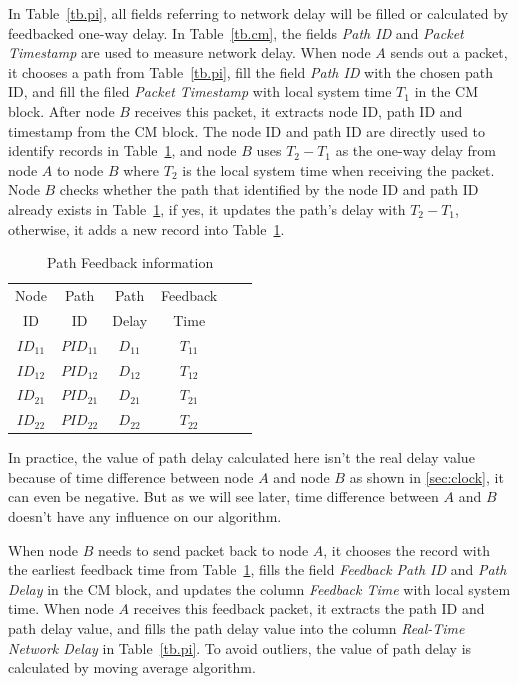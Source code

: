 In Table~\ref{tb.pi}, all fields referring to network delay will be filled or calculated by feedbacked one-way delay. In Table~\ref{tb.cm}, the fields \emph{Path ID} and \emph{Packet Timestamp} are used to measure network delay. When node $A$ sends out a packet, it chooses a path from Table~\ref{tb.pi}, fill the field \emph{Path ID} with the chosen path ID, and fill the filed \emph{Packet Timestamp} with local system time $T_1$ in the CM block. After node $B$ receives this packet, it extracts node ID, path ID and timestamp from the CM block. The node ID and path ID are directly used to identify records in Table~\ref{tb.ps}, and node $B$ uses $T_2-T_1$ as the one-way delay from node $A$ to node $B$ where $T_2$ is the local system time when receiving the packet. Node $B$ checks whether the path that identified by the node ID and path ID already exists in Table~\ref{tb.ps}, if yes, it updates the path's delay with $T_2-T_1$, otherwise, it adds a new record into Table~\ref{tb.ps}.

\begin{table}[htbp]
\caption{\label{tb.ps}Path Feedback information}
\centering
\begin{tabular}{|c|c|c|c|c|c|}
\hline
 Node   & Path    & Path      & Feedback           \\
  ID    &  ID     & Delay     & Time               \\
\hline
${ID}_{11}$&${PID}_{11}$&${D}_{11}$&${T}_{11}$   \\
\hline
${ID}_{12}$&${PID}_{12}$&${D}_{12}$&${T}_{12}$   \\
\hline
${ID}_{21}$&${PID}_{21}$&${D}_{21}$&${T}_{21}$   \\
\hline
${ID}_{22}$&${PID}_{22}$&${D}_{22}$&${T}_{22}$   \\
\hline
\end{tabular}
\end{table}

In practice, the value of path delay calculated here isn't the real delay value because of time difference between node $A$ and node $B$ as shown in \ref{sec:clock}, it can even be negative. But as we will see later, time difference between $A$ and $B$ doesn't have any influence on our algorithm.

When node $B$ needs to send packet back to node $A$, it chooses the record with the earliest feedback time from Table~\ref{tb.ps}, fills the field \emph{Feedback Path ID} and \emph{Path Delay} in the CM block, and updates the column \emph{Feedback Time} with local system time. When node $A$ receives this feedback packet, it extracts the path ID and path delay value, and fills the path delay value into the column \emph{Real-Time Network Delay} in Table~\ref{tb.pi}. To avoid outliers, the value of path delay is calculated by moving average algorithm.

